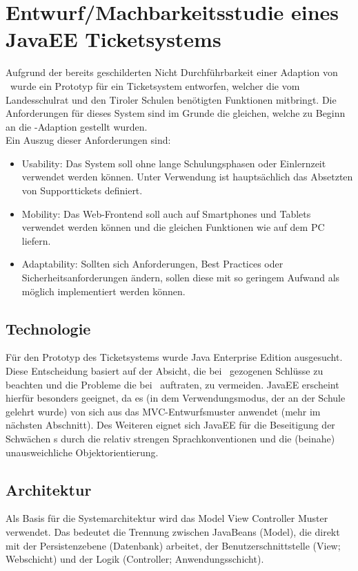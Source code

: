 \chapter[Systementwurf]{Entwurf/Machbarkeitsstudie eines JavaEE Ticketsystems}

\def \currentAuthor{Jakob Tomasi}

Aufgrund der bereits geschilderten Nicht Durchführbarkeit einer Adaption von \getOst\ wurde ein Prototyp für ein Ticketsystem entworfen, welcher die vom Landesschulrat und den Tiroler Schulen benötigten Funktionen mitbringt. Die Anforderungen für dieses System sind im Grunde die gleichen, welche zu Beginn an die \getOst-Adaption gestellt wurden. 
\\
Ein Auszug dieser Anforderungen sind:

\begin{itemize}
	\item Usability: Das System soll ohne lange Schulungsphasen oder Einlernzeit verwendet werden können. Unter Verwendung ist hauptsächlich das Absetzten von Supporttickets definiert.
	\item Mobility: Das Web-Frontend soll auch auf Smartphones und Tablets verwendet werden können und die gleichen Funktionen wie auf dem PC liefern.
	\item Adaptability: Sollten sich Anforderungen, Best Practices oder Sicherheitsanforderungen ändern, sollen diese mit so geringem Aufwand als möglich implementiert werden können.
\end{itemize}

\section{Technologie}
Für den Prototyp des Ticketsystems wurde Java Enterprise Edition ausgesucht. Diese Entscheidung basiert auf der Absicht, die bei \getOst\ gezogenen Schlüsse zu beachten und die Probleme die bei \getOst\ auftraten, zu vermeiden. JavaEE erscheint hierfür besonders geeignet, da es (in dem Verwendungsmodus, der an der Schule gelehrt wurde) von sich aus das MVC-Entwurfsmuster anwendet (mehr im nächsten Abschnitt). Des Weiteren eignet sich JavaEE für die Beseitigung der Schwächen \getOst s durch die relativ strengen Sprachkonventionen und die (beinahe) unausweichliche Objektorientierung.

\section{Architektur}
Als Basis für die Systemarchitektur wird das Model View Controller Muster verwendet. Das bedeutet die Trennung zwischen JavaBeans (Model), die direkt mit der Persistenzebene (Datenbank) arbeitet, der Benutzerschnittstelle (View; Webschicht) und der Logik (Controller; Anwendungsschicht).

